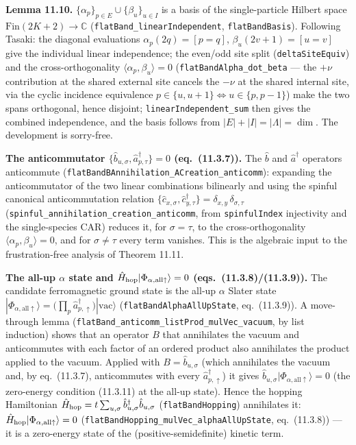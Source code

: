 \documentclass[a4paper,11pt]{article}
\begin{document}
\medskip
\noindent\textbf{Lemma 11.10.}
$\{\alpha_p\}_{p\in E} \cup \{\beta_u\}_{u\in I}$ is a basis of the
single-particle Hilbert space $\mathrm{Fin}(2K+2)\to\mathbb C$
(\texttt{flatBand\_linearIndependent}, \texttt{flatBandBasis}). Following Tasaki:
the diagonal evaluations $\alpha_p(2q) = [p=q]$, $\beta_u(2v{+}1) = [u=v]$ give the
individual linear independence; the even/odd site split
(\texttt{deltaSiteEquiv}) and the cross-orthogonality
$\langle\alpha_p,\beta_u\rangle = 0$ (\texttt{flatBandAlpha\_dot\_beta} --- the
$+\nu$ contribution at the shared external site cancels the $-\nu$ at the shared
internal site, via the cyclic incidence equivalence $p\in\{u,u{+}1\}
\Leftrightarrow u\in\{p,p{-}1\}$) make the two spans orthogonal, hence disjoint;
\texttt{linearIndependent\_sum} then gives the combined independence, and the
basis follows from $|E|+|I| = |\Lambda| = \dim$. The development is sorry-free.

\medskip
\noindent\textbf{The anticommutator $\{\hat b_{u,\sigma}, \hat a^\dagger_{p,\tau}\}
= 0$ (eq.~(11.3.7)).}
The $\hat b$ and $\hat a^\dagger$ operators anticommute
(\texttt{flatBandBAnnihilation\_ACreation\_anticomm}): expanding the
anticommutator of the two linear combinations bilinearly and using the spinful
canonical anticommutation relation $\{\hat c_{x,\sigma}, \hat c^\dagger_{y,\tau}\}
= \delta_{x,y}\,\delta_{\sigma,\tau}$
(\texttt{spinful\_annihilation\_creation\_anticomm}, from
\texttt{spinfulIndex} injectivity and the single-species CAR) reduces it, for
$\sigma=\tau$, to the cross-orthogonality
$\langle\alpha_p,\beta_u\rangle = 0$, and for $\sigma\ne\tau$ every term vanishes.
This is the algebraic input to the frustration-free analysis of Theorem 11.11.

\medskip
\noindent\textbf{The all-up $\alpha$ state and $\hat H_{\rm hop}|\Phi_{\alpha,
\mathrm{all}\uparrow}\rangle = 0$ (eqs.~(11.3.8)/(11.3.9)).}
The candidate ferromagnetic ground state is the all-up $\alpha$ Slater state
$|\Phi_{\alpha,\mathrm{all}\uparrow}\rangle = \bigl(\prod_p \hat a^\dagger_{p,
\uparrow}\bigr)|\mathrm{vac}\rangle$ (\texttt{flatBandAlphaAllUpState}, eq.~(11.3.9)).
A move-through lemma (\texttt{flatBand\_anticomm\_listProd\_mulVec\_vacuum}, by
list induction) shows that an operator $B$ that annihilates the vacuum and
anticommutes with each factor of an ordered product also annihilates the product
applied to the vacuum. Applied with $B = \hat b_{u,\sigma}$ (which annihilates
the vacuum and, by eq.~(11.3.7), anticommutes with every $\hat a^\dagger_{p,
\uparrow}$) it gives $\hat b_{u,\sigma}|\Phi_{\alpha,\mathrm{all}\uparrow}\rangle
= 0$ (the zero-energy condition (11.3.11) at the all-up state). Hence the hopping
Hamiltonian $\hat H_{\rm hop} = t\sum_{u,\sigma}\hat b^\dagger_{u,\sigma}
\hat b_{u,\sigma}$ (\texttt{flatBandHopping}) annihilates it:
$\hat H_{\rm hop}|\Phi_{\alpha,\mathrm{all}\uparrow}\rangle = 0$
(\texttt{flatBandHopping\_mulVec\_alphaAllUpState}, eq.~(11.3.8)) --- it is a
zero-energy state of the (positive-semidefinite) kinetic term.
\end{document}
